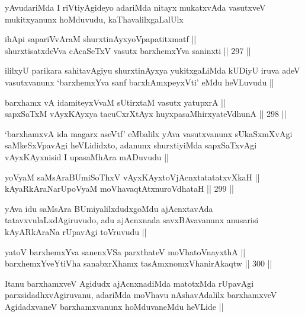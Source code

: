 \begin{artha}
yAvudariMda I riVtiyAgideyo adariMda nitayx mukatxvAda vasutxveV
mukitxyanunx hoMduvudu, kaThavalilxgaLalUlx 
\end{artha}

\begin{shl}
ihApi sapariVvAraM shurxtinAyxyoVpapatitxmatf || \\
shurxtisatxdeVva cA\s \s caSeTxV vasutx barxhemxYva saninxti ||  297 ||  
\end{shl}

\begin{artha}
ililxyU parikara sahitavAgiyu shurxtinAyxya yukitxgaLiMda kUDiyU iruva
adeV vasutxvanunx `barxhemxYva sanf barxhAmxpeyxVti' eMdu heVLuvudu ||
\end{artha}

\begin{shl}
barxhamx vA idamiteyxVvaM sUtirxtaM vasutx yatupxrA || \\
sapxSaTxM vAyxKAyxya tacuCxrXtAyx huyxpasaMhirxyateV\s dhunA ||  298 ||  
\end{shl}

\begin{artha}
`barxhamxvA ida magarx aseVtf' eMbalilx yAva vasutxvanunx sUkaSxmXvAgi
  saMkeSxVpavAgi heVLididxto, adanunx shurxtiyiMda sapxSaTxvAgi
  vAyxKAyxnisid I upasaMhAra mADuvudu ||
\end{artha}


\begin{shl}
yoV\s yaM saMsAraBUmiSoThxV vAyxKAyxtoV\s jAcnxtatatatxvXkaH || \\
kAyaRkAraNarUpoV\s yaM moVhavaqtAtxnuroVdhataH ||  299 ||  
\end{shl}

\begin{artha}
yAva idu saMsAra BUmiyalilxdudxgoMdu ajAcnxtavAda
tatavxvulaLxdAgiruvudo, adu ajAcnxnada savxBAvavanunx anusarisi
kAyARkAraNa rUpavAgi toVruvudu ||
\end{artha}

\begin{shl}
yatoV barxhemxYva sanenxVSa parxthateV moVhatoV\s nayxthA || \\
barxhemxYveYtiVha sanabxrXhamx tasAmxnomxVhanirAkaqtw ||  300 ||  
\end{shl}

\begin{artha}
Itanu barxhamxveV Agidudx ajAcnxnadiMda matotxMda rUpavAgi
parxsidadhxvAgiruvanu, adariMda moVhavu nAshavAdalilx barxhamxveV
AgidadxvaneV barxhamxvanunx hoMduvaneMdu heVLide ||
\end{artha}

